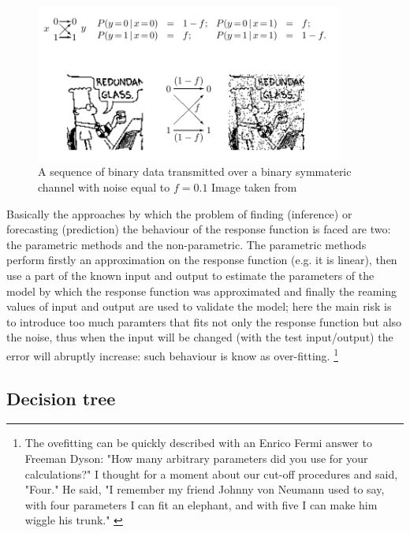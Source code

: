 \documentclass[
12pt, %
a4paper, %
oneside, %
headinclude,footinclude, %
BCOR5mm, %
]{scrartcl}
\begin{document}
\begin{figure}[h]
\begin{center}
\includegraphics[width=0.9\textwidth]{Pic/Noisy_channel.png}
\caption{A sequence of binary data transmitted over a binary symmateric channel with noise equal to $f=0.1$   Image taken from \cite{mackay2003information}}
\label{Noisy_channel}
\end{center}
\end{figure}
Basically the approaches by which the problem of finding (inference) or forecasting (prediction) the behaviour of the response function is faced are two: the parametric methods and the non-parametric. The parametric methods perform firstly an approximation on the response function (e.g. it is linear), then use a part of the known input and output to estimate the parameters of the model by which the response function was approximated and finally the reaming values of input and output are used to validate the model; here the main risk is to introduce too much paramters that fits not only the response function but also the noise, thus when the input will be changed (with the test input/output) the error will abruptly increase: such behaviour is know as over-fitting. \footnote{The ovefitting can be quickly described with an Enrico Fermi answer to Freeman Dyson: "How many arbitrary parameters did you use for your calculations?" I thought for a moment about our cut-off procedures and said, "Four." He said, "I remember my friend Johnny von Neumann used to say, with four parameters I can fit an elephant, and with five I can make him wiggle his trunk." \cite{dyson}}




\clearpage

\subsection{Decision tree}
\end{document}
